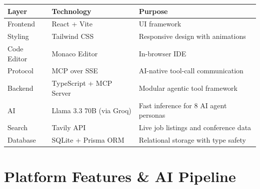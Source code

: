 \documentclass[11pt, a4paper]{article}
\begin{document}
\begin{table}[H]
\centering
\renewcommand{\arraystretch}{1.15}
\begin{tabularx}{\textwidth}{@{}l l X@{}}
\toprule
\textbf{Layer} & \textbf{Technology} & \textbf{Purpose} \\
\midrule
Frontend & React + Vite & UI framework  \\
Styling & Tailwind CSS  & Responsive design with animations \\
Code Editor & Monaco Editor & In-browser IDE \\
Protocol & MCP over SSE & AI-native tool-call communication \\
Backend & TypeScript + MCP Server & Modular agentic tool framework \\
AI & Llama 3.3 70B (via Groq) & Fast inference for 8 AI agent personas \\
Search & Tavily API & Live job listings and conference data \\
Database & SQLite + Prisma ORM & Relational storage with type safety \\
\bottomrule
\end{tabularx}
\end{table}

\newpage

\section{Platform Features \& AI Pipeline}
\end{document}
